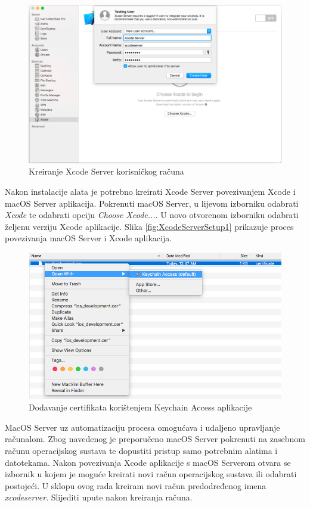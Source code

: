 \documentclass[times, utf8, diplomski, numeric]{fer}
\begin{document}
\begin{appendices}
\begin{figure}
\centering
\includegraphics[scale=0.35]{XcodeServerSetup2}
\caption{Kreiranje Xcode Server korisničkog računa}
\label{fig:XcodeServerSetup2}
\end{figure}

Nakon instalacije alata je potrebno kreirati Xcode Server povezivanjem Xcode i macOS Server aplikacija. Pokrenuti macOS Server, u lijevom izborniku odabrati \textit{Xcode} te odabrati opciju \textit{Choose Xcode...}. U novo otvorenom izborniku odabrati željenu verziju Xcode aplikacije. Slika \ref{fig:XcodeServerSetup1} prikazuje proces povezivanja macOS Server i Xcode aplikacija.

\begin{figure}[b!]
\centering
\includegraphics[scale=0.4]{DodavanjeCertifikata}
\caption{Dodavanje certifikata korištenjem Keychain Access aplikacije}
\label{fig:DodavanjeCertifikata}
\end{figure}

MacOS Server uz automatizaciju procesa omogućava i udaljeno upravljanje računalom. Zbog navedenog je preporučeno macOS Server pokrenuti na zasebnom računu operacijskog sustava te dopustiti pristup samo potrebnim alatima i datotekama. Nakon povezivanja Xcode aplikacije s macOS Serverom otvara se izbornik u kojem je moguće kreirati novi račun operacijskog sustava ili odabrati postojeći. U sklopu ovog rada kreiram novi račun predodređenog imena \textit{xcodeserver}. Slijediti upute nakon kreiranja računa.



\end{appendices}
\end{document}
